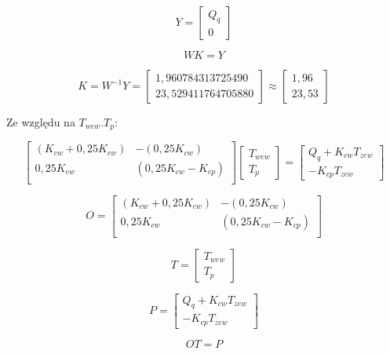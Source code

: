 \documentclass{article}
\begin{document}
$$
Y=\begin{bmatrix}
        Q_{q}\\
        0
    \end{bmatrix}
$$

$$
WK=Y
$$

$$
K=W^{-1}Y=
\begin{bmatrix}
        1,960784313725490\\
        23,529411764705880
\end{bmatrix}\approx 
\begin{bmatrix}
        1,96 \\
        23,53
\end{bmatrix}
$$

\begin{flushleft}

Ze względu na  $T_{wew}. T_{p}$:

\end{flushleft}
$$
\begin{bmatrix}
        (K_{cw}+0,25K_{cw})& -(0,25K_{cw})            \\[0.3em]
        0,25K_{cw} & (0,25K_{cw}-K_{cp})            \\[0.3em]
    \end{bmatrix}
    \begin{bmatrix}
        T_{wew}\\
        T_{p}
    \end{bmatrix}
    =
    \begin{bmatrix}
        Q_{q}+K_{cw}T_{zew}\\
        -K_{cp}T_{zew}
    \end{bmatrix}
$$

$$
O=\begin{bmatrix}
        (K_{cw}+0,25K_{cw})& -(0,25K_{cw})            \\[0.3em]
        0,25K_{cw} & (0,25K_{cw}-K_{cp})            \\[0.3em]
    \end{bmatrix}
$$

$$
T=\begin{bmatrix}
        T_{wew}\\
        T_{p}
    \end{bmatrix}
$$

$$
P=\begin{bmatrix}
        Q_{q}+K_{cw}T_{zew}\\
        -K_{cp}T_{zew}
    \end{bmatrix}
$$

$$
OT=P
$$
\end{document}

